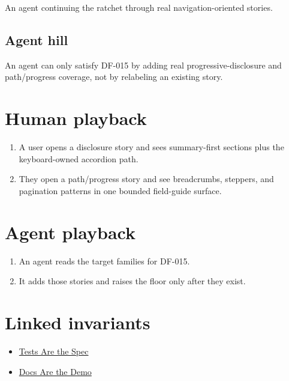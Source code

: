 An agent continuing the ratchet through real navigation-oriented stories.

\subsection{Agent hill}\label{record-077-agent-hill}

An agent can only satisfy DF-015 by adding real progressive-disclosure and path/progress coverage, not by relabeling an existing story.

\section{Human playback}\label{record-077-human-playback}

\begin{enumerate}
\def\labelenumi{\arabic{enumi}.}
\tightlist
\item
  A user opens a disclosure story and sees summary-first sections plus the keyboard-owned accordion path.
\item
  They open a path/progress story and see breadcrumbs, steppers, and pagination patterns in one bounded field-guide surface.
\end{enumerate}

\section{Agent playback}\label{record-077-agent-playback}

\begin{enumerate}
\def\labelenumi{\arabic{enumi}.}
\tightlist
\item
  An agent reads the target families for DF-015.
\item
  It adds those stories and raises the floor only after they exist.
\end{enumerate}

\section{Linked invariants}\label{record-077-linked-invariants}

\begin{itemize}
\tightlist
\item
  \href{https://github.com/flyingrobots/bijou/blob/cbd70612140e7a450d764b3c7be1c6af878b99bc/docs/invariants/tests-are-the-spec.md}{Tests Are the Spec}
\item
  \href{https://github.com/flyingrobots/bijou/blob/cbd70612140e7a450d764b3c7be1c6af878b99bc/docs/invariants/docs-are-the-demo.md}{Docs Are the Demo}
\end{itemize}

